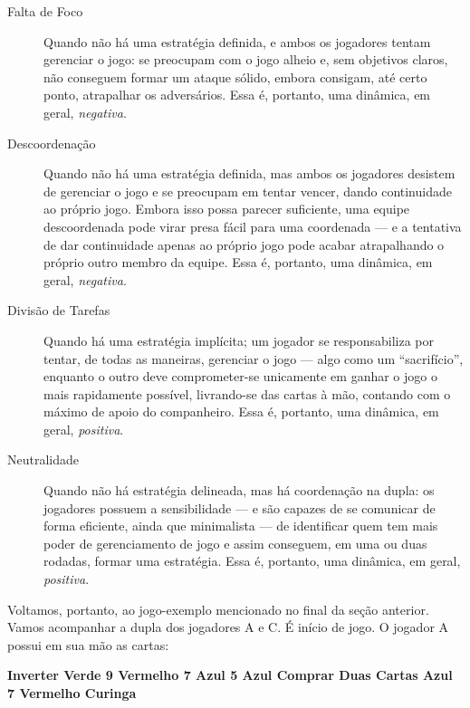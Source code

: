 \begin{description}
\item[Falta de Foco]{Quando não há uma estratégia definida, e ambos os jogadores tentam gerenciar o jogo: se preocupam com o jogo alheio e, sem objetivos claros, não conseguem formar um ataque sólido, embora consigam, até certo ponto, atrapalhar os adversários. Essa é, portanto, uma dinâmica, em geral, \emph{negativa}.}
\item[Descoordenação]{Quando não há uma estratégia definida, mas ambos os jogadores desistem de gerenciar o jogo e se preocupam em tentar vencer, dando continuidade ao próprio jogo. Embora isso possa parecer suficiente, uma equipe descoordenada pode virar presa fácil para uma coordenada --- e a tentativa de dar continuidade apenas ao próprio jogo pode acabar atrapalhando o próprio outro membro da equipe. Essa é, portanto, uma dinâmica, em geral, \emph{negativa}.}
\item[Divisão de Tarefas]{Quando há uma estratégia implícita; um jogador se responsabiliza por tentar, de todas as maneiras, gerenciar o jogo --- algo como um ``sacrifício'', enquanto o outro deve comprometer-se unicamente em ganhar o jogo o mais rapidamente possível, livrando-se das cartas à mão, contando com o máximo de apoio do companheiro. Essa é, portanto, uma dinâmica, em geral, \emph{positiva}.}
\item[Neutralidade]{Quando não há estratégia delineada, mas há coordenação na dupla: os jogadores possuem a sensibilidade --- e são capazes de se comunicar de forma eficiente, ainda que minimalista --- de identificar quem tem mais poder de gerenciamento de jogo e assim conseguem, em uma ou duas rodadas, formar uma estratégia. Essa é, portanto, uma dinâmica, em geral, \emph{positiva}.}
\end{description}

Voltamos, portanto, ao jogo-exemplo mencionado no final da seção anterior. Vamos acompanhar a dupla dos jogadores A e C. É início de jogo. O jogador A possui em sua mão as cartas:

\vspace{0.5cm}

\textbf{Inverter Verde \hspace{1cm} 9 Vermelho \hspace{1cm} 7 Azul \hspace{1cm} 5 Azul \hspace{1cm} Comprar Duas Cartas Azul \hspace{1cm} 7 Vermelho \hspace{1cm} Curinga}

